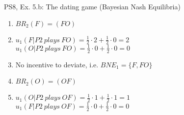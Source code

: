 \begin{frame}{PS8, Ex. 5.b: The dating game (Bayesian Nash Equilibria)}
\begin{multicols}{2}
      \vfill\null\columnbreak
      \begin{enumerate}
        \item[1.a:] $BR_2(F)=(FO)$
        \item[1.b:] $u_1(F|P2\ plays\ FO)=\frac{1}{2}\cdot2+\frac{1}{2}\cdot0=2$\\
                    $u_1(O|P2\ plays\ FO)=\frac{1}{2}\cdot0+\frac{1}{2}\cdot0=0$
        \item[1.c:] No incentive to deviate, i.e. $BNE_1=\{F,FO\}$
        \item[2.a:] $BR_2(O)=(OF)$
        \item[2.b:] $u_1(O|P2\ plays\ OF)=\frac{1}{2}\cdot1+\frac{1}{2}\cdot1=1$\\
                    $u_1(F|P2\ plays\ OF)=\frac{1}{2}\cdot0+\frac{1}{2}\cdot0=0$
      \end{enumerate}
      \vfill\null
    \end{multicols}
\end{frame}
